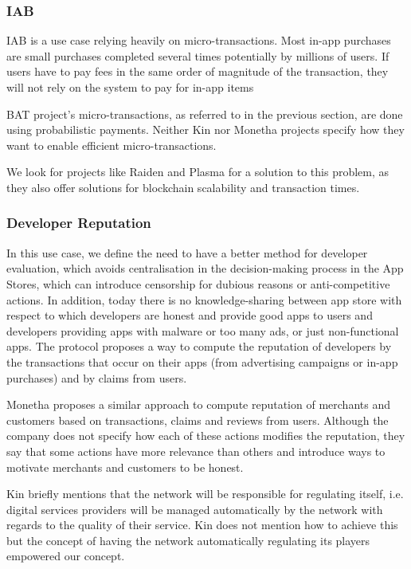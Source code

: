 \subsubsection{IAB}

IAB is a use case relying heavily on micro-transactions. Most in-app purchases are small purchases completed several times potentially by millions of users. If users have to pay fees in the same order of magnitude of the transaction, they will not rely on the system to pay for in-app items

\medskip

BAT project's micro-transactions, as referred to in the previous section, are done using probabilistic payments. Neither Kin nor Monetha projects specify how they want to enable efficient micro-transactions.

\medskip

We look for projects like Raiden and Plasma for a solution to this problem, as they also offer solutions for blockchain scalability and transaction times.

\subsubsection{Developer Reputation}

In this use case, we define the need to have a better method for developer evaluation, which avoids centralisation in the decision-making process in the App Stores, which can introduce censorship for dubious reasons or anti-competitive actions. In addition, today there is no knowledge-sharing between app store with respect to which developers are honest and provide good apps to users and developers providing apps with malware or too many ads, or just non-functional apps. The protocol proposes a way to compute the reputation of developers by the transactions that occur on their apps (from advertising campaigns or in-app purchases) and by claims from users.

\medskip

Monetha proposes a similar approach to compute reputation of merchants and customers based on transactions, claims and reviews from users. Although the company does not specify how each of these actions modifies the reputation, they say that some actions have more relevance than others and introduce ways to motivate merchants and customers to be honest.

\medskip

Kin briefly mentions that the network will be responsible for regulating itself, i.e. digital services providers will be managed automatically by the network with regards to the quality of their service. Kin does not mention how to achieve this but the concept of having the network automatically regulating its players empowered our concept.

